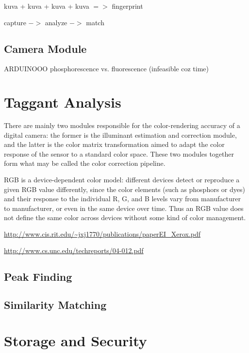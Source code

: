 \documentclass[thesis.tex]{subfiles}
\begin{document}
kuva + kuva + kuva + kuva $=>$ fingerprint

capture $->$ analyze $->$ match

\subsection{Camera Module}
ARDUINOOO
phosphorescence vs. fluorescence (infeasible coz time)

\section{Taggant Analysis}
\label{chapter:taggant-analysis}

There are mainly two modules responsible for the color-rendering accuracy of a digital camera: the former is the illuminant estimation and correction module, and the latter is the color matrix transformation aimed to adapt the color response of the sensor to a standard color space. These two modules together form what may be called the color correction pipeline.

RGB is a device-dependent color model: different devices detect or reproduce a given RGB value differently, since the color elements (such as phosphors or dyes) and their response to the individual R, G, and B levels vary from manufacturer to manufacturer, or even in the same device over time. Thus an RGB value does not define the same color across devices without some kind of color management.

\url{http://www.cis.rit.edu/~jxj1770/publications/paperEI_Xerox.pdf}

\url{http://www.cs.unc.edu/techreports/04-012.pdf}

\subsection{Peak Finding}

\subsection{Similarity Matching}

\section{Storage and Security}
\label{chapter:storage-security}
\end{document}
